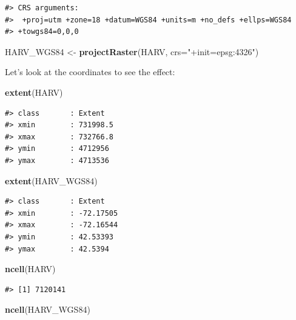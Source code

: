 \documentclass[]{book}
\newenvironment{Shaded}{\begin{snugshade}}{\end{snugshade}}
\newcommand{\KeywordTok}[1]{\textcolor[rgb]{0.13,0.29,0.53}{\textbf{#1}}}
\newcommand{\DataTypeTok}[1]{\textcolor[rgb]{0.13,0.29,0.53}{#1}}
\newcommand{\StringTok}[1]{\textcolor[rgb]{0.31,0.60,0.02}{#1}}
\newcommand{\NormalTok}[1]{#1}
\begin{document}
\begin{verbatim}
#> CRS arguments:
#>  +proj=utm +zone=18 +datum=WGS84 +units=m +no_defs +ellps=WGS84
#> +towgs84=0,0,0
\end{verbatim}

\begin{Shaded}
\begin{Highlighting}[]
\NormalTok{HARV_WGS84 <-}\StringTok{ }\KeywordTok{projectRaster}\NormalTok{(HARV, }\DataTypeTok{crs=}\StringTok{"+init=epsg:4326"}\NormalTok{)}
\end{Highlighting}
\end{Shaded}

Let's look at the coordinates to see the effect:

\begin{Shaded}
\begin{Highlighting}[]
\KeywordTok{extent}\NormalTok{(HARV)}
\end{Highlighting}
\end{Shaded}

\begin{verbatim}
#> class       : Extent 
#> xmin        : 731998.5 
#> xmax        : 732766.8 
#> ymin        : 4712956 
#> ymax        : 4713536
\end{verbatim}

\begin{Shaded}
\begin{Highlighting}[]
\KeywordTok{extent}\NormalTok{(HARV_WGS84)}
\end{Highlighting}
\end{Shaded}

\begin{verbatim}
#> class       : Extent 
#> xmin        : -72.17505 
#> xmax        : -72.16544 
#> ymin        : 42.53393 
#> ymax        : 42.5394
\end{verbatim}

\begin{Shaded}
\begin{Highlighting}[]
\KeywordTok{ncell}\NormalTok{(HARV)}
\end{Highlighting}
\end{Shaded}

\begin{verbatim}
#> [1] 7120141
\end{verbatim}

\begin{Shaded}
\begin{Highlighting}[]
\KeywordTok{ncell}\NormalTok{(HARV_WGS84)}
\end{Highlighting}
\end{Shaded}
\end{document}
